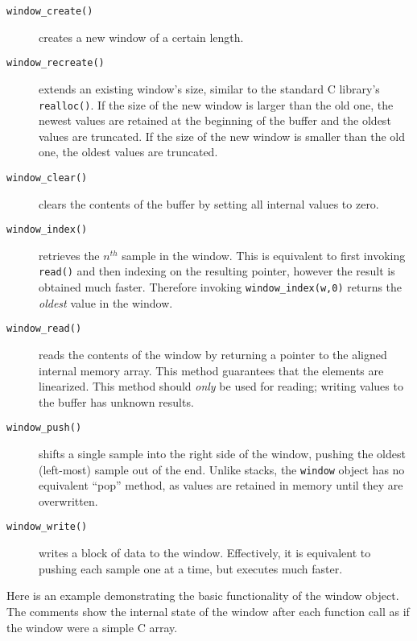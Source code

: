 \begin{description}
\item[{\tt window\_create()}]
    creates a new window of a certain length.
\item[{\tt window\_recreate()}]
    extends an existing window's size, similar to the standard C library's
    {\tt realloc()}.
    If the size of the new window is larger than the old one, the newest
    values are retained at the beginning of the buffer and the oldest values
    are truncated.
    If the size of the new window is smaller than the old one, the oldest
    values are truncated.
\item[{\tt window\_clear()}]
    clears the contents of the buffer by setting all internal values to zero.
\item[{\tt window\_index()}]
    retrieves the $n^{th}$ sample in the window.
    This is equivalent to first invoking {\tt read()} and then indexing on the
    resulting pointer, however the result is obtained much faster.
    Therefore invoking {\tt window\_index(w,0)} returns the {\em oldest} value
    in the window.
\item[{\tt window\_read()}]
    reads the contents of the window by returning a pointer to the aligned
    internal memory array.
    This method guarantees that the elements are linearized.
    This method should {\em only} be used for reading; writing values to the
    buffer has unknown results.
\item[{\tt window\_push()}]
    shifts a single sample into the right side of the window, pushing the
    oldest (left-most) sample out of the end.
    Unlike stacks, the {\tt window} object has no equivalent ``pop'' method,
    as values are retained in memory until they are overwritten.
\item[{\tt window\_write()}]
    writes a block of data to the window.
    Effectively, it is equivalent to pushing each sample one at a time, but
    executes much faster.
\end{description}

Here is an example demonstrating the basic functionality of the window object.
The comments show the internal state of the window after each function call as
if the window were a simple C array.


